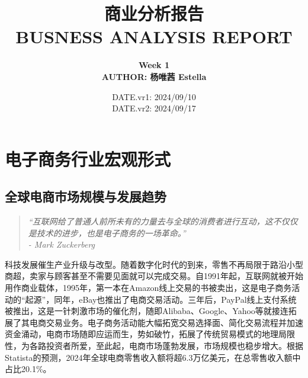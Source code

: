 \documentclass[12pt]{ctexart}
\title{
\Huge{\textbf{商业分析报告}}\\
\Large{\textbf{BUSNESS ANALYSIS REPORT}}\\
\vspace{8mm}
}
\author{\textbf{Week 1} \\
\textbf{AUTHOR: 杨唯茜 Estella}\\
}
\date{DATE.vr1: 2024/09/10 \\
      DATE.vr2: 2024/09/17}
\begin{document}
\maketitle
\thispagestyle{empty} %

\vspace{5mm}





\newpage
\clearpage
\thispagestyle{empty}
\thispagestyle{empty} %
\begin{titlepage}
{
\clearpage
\thispagestyle{empty}
  \color{black}
  \tableofcontents
}
\end{titlepage}
\newpage


\pagestyle{plain} 

\clearpage %

\section{电子商务行业宏观形式}

\subsection{全球电商市场规模与发展趋势}
\begin{quote}
    \textit{“互联网给了普通人前所未有的力量去与全球的消费者进行互动，这不仅仅是技术的进步，也是电子商务的一场革命。”} \\
    \raggedleft \textit{- Mark Zuckerberg}
\end{quote}

科技发展催生产业升级与改型。随着数字化时代的到来，零售不再局限于路沿小型商超，卖家与顾客甚至不需要见面就可以完成交易。自1991年起，互联网就被开始用作商业载体，1995年，第一本在Amazon线上交易的书被卖出，这是电子商务活动的“起源”，同年，eBay也推出了电商交易活动。三年后，PayPal线上支付系统被推出，这是一针刺激市场的催化剂，随即Alibaba、Google、Yahoo等就接连拓展了其电商交易业务。电子商务活动能大幅拓宽交易选择面、简化交易流程并加速资金涌动，电商市场随即应运而生，势如破竹，拓展了传统贸易模式的地理局限性，为各路投资者所爱，至此起，电商市场蓬勃发展，市场规模也稳步增大。根据Statista的预测\cite{1}，2024年全球电商零售收入额将超6.3万亿美元，在总零售收入额中占比20.1\%。
\end{document}
